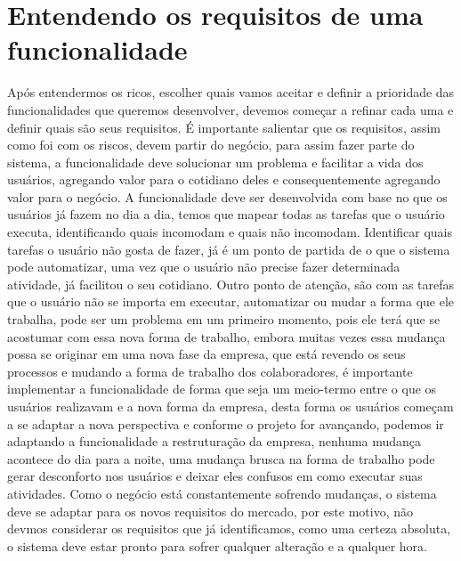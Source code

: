      \section{Entendendo os requisitos de uma funcionalidade}
        Após entendermos os ricos, escolher quais vamos aceitar e definir a prioridade
        das funcionalidades que queremos desenvolver, devemos começar a refinar cada
        uma e definir quais são seus requisitos. É importante salientar que os
        requisitos, assim como foi com os riscos, devem partir do negócio, para assim
        fazer parte do sistema, a funcionalidade deve solucionar um problema e facilitar
        a vida dos usuários, agregando valor para o cotidiano deles e consequentemente
        agregando valor para o negócio. \newline
        A funcionalidade deve ser desenvolvida com base no que os usuários já fazem
        no dia a dia, temos que mapear todas as tarefas que o usuário executa,
        identificando quais incomodam e quais não incomodam. Identificar quais tarefas
        o usuário não gosta de fazer, já é um ponto de partida de o que o sistema pode
        automatizar, uma vez que o usuário não precise fazer determinada atividade,
        já facilitou o seu cotidiano. Outro ponto de atenção, são com as tarefas que
        o usuário não se importa em executar, automatizar ou mudar a forma que ele
        trabalha, pode ser um problema em um primeiro momento, pois ele terá que
        se acostumar com essa nova forma de trabalho, embora muitas vezes essa mudança
        possa se originar em uma nova fase da empresa, que está revendo os seus processos
        e mudando a forma de trabalho dos colaboradores, é importante implementar
        a funcionalidade de forma que seja um meio-termo entre o que os usuários
        realizavam e a nova forma da empresa, desta forma os usuários começam a
        se adaptar a nova perspectiva e conforme o projeto for avançando, podemos
        ir adaptando a funcionalidade a restruturação da empresa, nenhuma mudança
        acontece do dia para a noite, uma mudança brusca na forma de trabalho
        pode gerar desconforto nos usuários e deixar eles confusos em como executar
        suas atividades. \newline
        Como o negócio está constantemente sofrendo mudanças, o sistema deve se
        adaptar para os novos requisitos do mercado, por este motivo, não devmos
        considerar os requisitos que já identificamos, como uma certeza absoluta,
        o sistema deve estar pronto para sofrer qualquer alteração e a qualquer hora.
